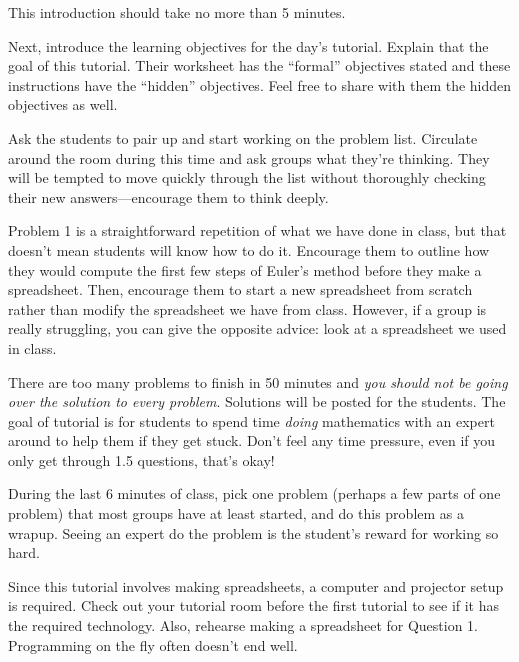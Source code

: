 		This introduction should take no more than 5 minutes.

		Next, introduce the learning objectives for the day's tutorial. Explain
		that the goal of this tutorial. Their worksheet has the ``formal'' objectives
		stated and these instructions have the ``hidden'' objectives. Feel free
		to share with them the hidden objectives as well.

		Ask the students to pair up and
		start working on the problem list. Circulate around the room during
		this time and ask groups what they're thinking. They will be tempted
		to move quickly through the list without thoroughly checking their
		new answers---encourage them to think deeply.

		Problem 1 is a straightforward repetition of what we have done in class, but that doesn't mean
		students will know how to do it. Encourage them to outline how they would compute the first few steps
		of Euler's method before they make a spreadsheet. Then, encourage them to start a new spreadsheet from scratch rather
		than modify the spreadsheet we have from class. However, if a group is really struggling, you can give the opposite
		advice: look at a spreadsheet we used in class.

		There are too many problems to finish in 50 minutes and \emph{you should not be going
		over the solution to every problem}. Solutions will be posted for the students. The goal
		of tutorial is for students to spend time \emph{doing} mathematics with an expert around
		to help them if they get stuck. Don't feel any time pressure, even if you only get through 1.5
		questions, that's okay!

		During the last 6 minutes of class, pick one problem (perhaps a few parts of one problem)
		that most groups have at least started, and do this problem as a wrapup. Seeing an expert do the
		problem is the student's reward for working so hard.

		Since this tutorial involves making spreadsheets, a computer and projector setup is required.
		Check out your tutorial room before the first tutorial to see if it has the required technology.
		Also, rehearse making a spreadsheet for Question 1. Programming on the fly often doesn't end well.

